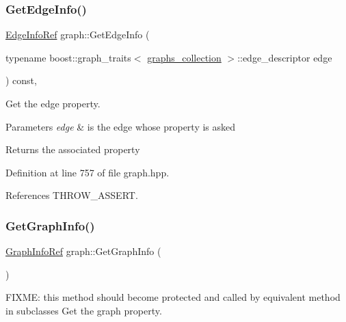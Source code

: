 \subsubsection{\texorpdfstring{Get\+Edge\+Info()}{GetEdgeInfo()}\hspace{0.1cm}{\footnotesize\ttfamily [2/2]}}
{\footnotesize\ttfamily \hyperlink{edge__info_8hpp_a65ddc964b1738667fc720f0de33aeef9}{Edge\+Info\+Ref} graph\+::\+Get\+Edge\+Info (\begin{DoxyParamCaption}\item[{typename boost\+::graph\+\_\+traits$<$ \hyperlink{structgraphs__collection}{graphs\+\_\+collection} $>$\+::edge\+\_\+descriptor}]{edge }\end{DoxyParamCaption}) const\hspace{0.3cm}{\ttfamily [inline]}, {\ttfamily [protected]}}



Get the edge property. 


\begin{DoxyParams}{Parameters}
{\em edge} & is the edge whose property is asked \\
\hline
\end{DoxyParams}
\begin{DoxyReturn}{Returns}
the associated property 
\end{DoxyReturn}


Definition at line 757 of file graph.\+hpp.



References T\+H\+R\+O\+W\+\_\+\+A\+S\+S\+E\+RT.

\mbox{\label{structgraph_a09feef618b21029c29d8635a7dedecdf}} 
\subsubsection{\texorpdfstring{Get\+Graph\+Info()}{GetGraphInfo()}}
{\footnotesize\ttfamily \hyperlink{graph__info_8hpp_a4a5c364c379e5139b7dc97e7e69c7da3}{Graph\+Info\+Ref} graph\+::\+Get\+Graph\+Info (\begin{DoxyParamCaption}{ }\end{DoxyParamCaption})\hspace{0.3cm}{\ttfamily [inline]}}



F\+I\+X\+ME\+: this method should become protected and called by equivalent method in subclasses Get the graph property. 

